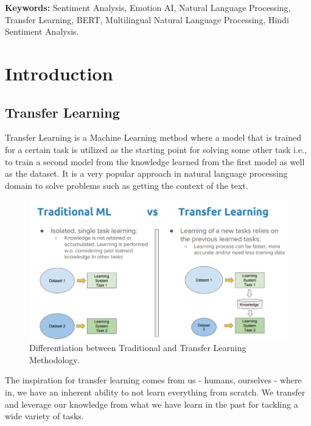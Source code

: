 \documentclass[a4paper, 12pt]{article}
\begin{document}
\begin{sloppypar}
\textbf{Keywords:} Sentiment Analysis, Emotion AI,  Natural Language Processing, Transfer Learning, BERT, Multilingual Natural Language Processing, Hindi Sentiment Analysis.
\thispagestyle{empty}
\clearpage
\tableofcontents
\thispagestyle{empty}
\clearpage
\setcounter{page}{1}
\section{Introduction}

\subsection{Transfer Learning}
Transfer Learning is a Machine Learning method where a model that is trained for a certain task is utilized as the starting point for solving some other task i.e., to train a second model from the knowledge learned from the first model as well as the dataset. It is a very popular approach in natural language processing domain to solve problems such as getting the context of the text.

\begin{figure}[H]
\begin{center}
\includegraphics[scale=0.45]{tl.png}
\caption{Differentiation between Traditional and Transfer Learning Methodology. \label{tl}} %
\end{center}
\end{figure}

The inspiration for transfer learning comes from us - humans, ourselves - where in, we have an inherent ability to not learn everything from scratch. We transfer and leverage our knowledge from what we have learn in the past for tackling a wide variety of tasks.\cite{sarkar_deep_2018}


\end{sloppypar}
\end{document}
